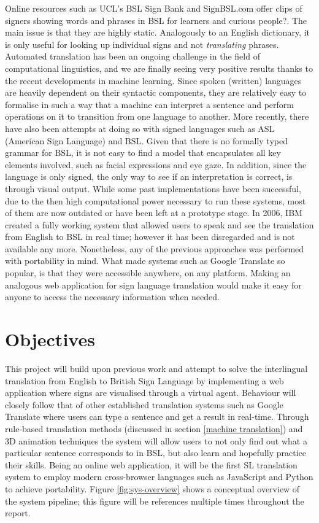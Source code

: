 \documentclass[12pt]{ociamthesis}  %
\begin{document}
Online resources such as UCL's BSL Sign Bank  and SignBSL.com  offer clips of signers showing words and phrases in BSL for learners and curious people?. The main issue is that they are highly static. Analogously to an English dictionary, it is only useful for looking up individual signs and not \textit{translating} phrases. Automated translation has been an ongoing challenge in the field of
computational linguistics, and we are finally seeing very positive results thanks to the recent developments in machine learning. Since spoken (written) languages are heavily dependent on their syntactic components, they are relatively easy to formalise in such a way that a machine can interpret a sentence and perform operations on it to transition from one language to another. More recently, there have also been attempts at doing so with signed languages such as ASL (American Sign Language) and BSL. Given that there is no formally typed grammar for BSL, it is not easy to find a model that encapsulates all key elements involved, such as facial expressions and eye gaze. In addition, since the language is only signed, the only way to see if an interpretation is correct, is through visual output. While some past implementations have been successful, due to the then high computational power necessary to run these systems, most of them are now outdated or have been left at a prototype stage. In 2006, IBM created a fully working system  that allowed users to speak and see the translation from English to BSL in real time; however it has been disregarded and is not available any more. Nonetheless, any of the previous approaches was performed with portability in mind. What made systems such as Google Translate so popular, is that they were accessible anywhere, on any platform. Making an analogous web application for sign language translation would make it easy for anyone to access the necessary information when needed. 

\section{Objectives}
This project will build upon previous work and attempt to solve the interlingual translation from English to British Sign Language by implementing a web application where signs are visualised through a virtual agent. Behaviour will closely follow that of other established translation systems such as Google Translate where users can type a sentence and get a result in real-time. Through rule-based translation methods (discussed in section \ref{machine translation}) and 3D animation techniques the system will allow users to not only find out what a particular sentence corresponds to in BSL, but also learn and hopefully practice their skills. Being an online web application, it will be the first SL translation system to employ modern cross-browser languages such as JavaScript and Python to achieve portability. Figure \ref{fig:sys-overview} shows a conceptual overview of the system pipeline; this figure will be references multiple times throughout the report.
\end{document}
